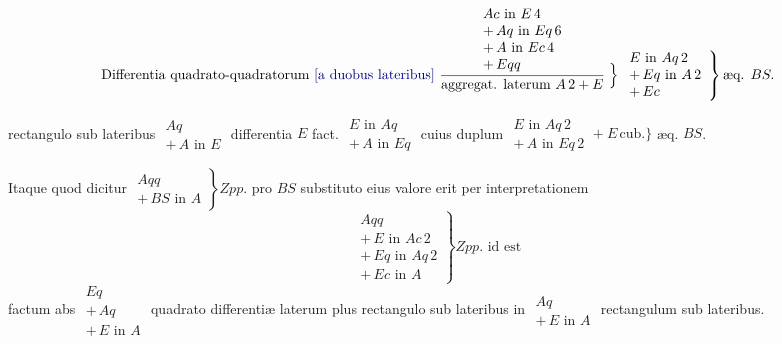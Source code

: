 \documentclass[11pt,a4paper]{article}
\begin{document}
\[ \text{Differentia quadrato-quadratorum \add{a duobus lateribus} } \dfrac{\begin{array}{l} Ac \text{ in } E\,4 \\ +\,Aq \text{ in } Eq\,6 \\ +\,A \text{ in } Ec\,4 \\ +\,Eqq \end{array}}{\text{aggregat. laterum } A\,2 + E} \;\Big\} \left.\begin{array}{l} E \text{ in } Aq\,2 \\ +\,Eq \text{ in } A\,2 \\ +\,Ec \end{array}\right\} \text{æq. } BS. \]

rectangulo sub lateribus $\begin{array}{l} Aq \\ +\,A \text{ in } E \end{array}$ differentia $E$ fact. $\begin{array}{l} E \text{ in } Aq \\ +\,A \text{ in } Eq \end{array}$ cuius duplum $\begin{array}{l} E \text{ in } Aq\,2 \\ +\,A \text{ in } Eq\,2 \end{array} + E\,\text{cub.} \}$ æq. $BS$.

Itaque quod dicitur $\left.\begin{array}{l} Aqq \\ +\,BS \text{ in } A \end{array}\right\} Zpp.$ pro $BS$ substituto eius valore erit per interpretationem
\[ \left.\begin{array}{l} Aqq \\ +\,E \text{ in } Ac\,2 \\ +\,Eq \text{ in } Aq\,2 \\ +\,Ec \text{ in } A \end{array}\right\} Zpp. \text{ id est} \]
factum abs $\begin{array}{l} Eq \\ +\,Aq \\ +\,E \text{ in } A \end{array}$ quadrato differentiæ laterum plus rectangulo sub lateribus in \struck{\ill{}} $\begin{array}{l} Aq \\ +\,E \text{ in } A \end{array}$ rectangulum sub lateribus.
\end{document}
